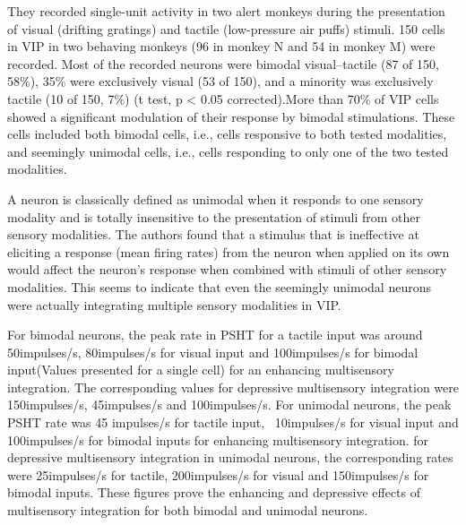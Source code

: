 \documentclass[10pt,oneside,final]{article}
\begin{document}
        They recorded single-unit activity in two alert monkeys during the presentation of visual (drifting gratings) and tactile (low-pressure air puffs) stimuli. 150 cells in VIP in two behaving monkeys (96 in monkey N and 54 in monkey M) were recorded. Most of the recorded neurons were bimodal visual–tactile (87 of 150, 58\%), 35\% were exclusively visual (53 of 150), and a minority was exclusively tactile (10 of 150, 7\%) (t test, p < 0.05 corrected).More than 70\% of VIP cells showed a significant modulation of their response by bimodal stimulations. These cells included both bimodal cells, i.e., cells responsive to both tested modalities, and seemingly unimodal cells, i.e., cells responding to only one of the two tested modalities. 

        A neuron is classically defined as unimodal when it responds to one sensory modality and is totally insensitive to the presentation of stimuli from other sensory modalities. The authors found that a stimulus that is ineffective at eliciting a response (mean firing rates) from the neuron when applied on its own would affect the neuron's response when combined with stimuli of other sensory modalities. This seems to indicate that even the seemingly unimodal neurons were actually integrating multiple sensory modalities in VIP. 

        For bimodal neurons, the peak rate in PSHT for a tactile input was around 50impulses/s, 80impulses/s for visual input and 100impulses/s for bimodal input(Values presented for a single cell) for an enhancing multisensory integration. The corresponding values for depressive multisensory integration were 150impulses/s, 45impulses/s and 100impulses/s. For unimodal neurons, the peak PSHT rate was 45 impulses/s for tactile input, ~10impulses/s for visual input and 100impulses/s for bimodal inputs for enhancing multisensory integration. for depressive multisensory integration in unimodal neurons, the corresponding rates were 25impulses/s for tactile, 200impulses/s for visual and 150impulses/s for bimodal inputs. These figures prove the enhancing and depressive effects of multisensory integration for both bimodal and unimodal neurons.
\end{document}
